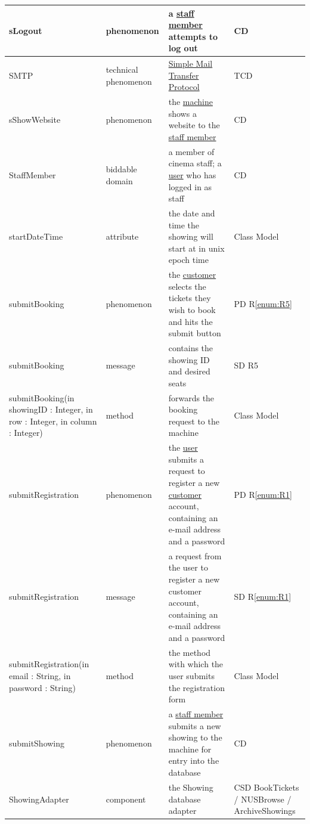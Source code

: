 \documentclass[a4paper,10pt,titlepage,bibtotoc,bibtotocnumbered]{scrreprt}
\begin{document}
\begin{longtable}{|p{.4\linewidth}|p{.2\linewidth}|p{.2\linewidth}|p{.2\linewidth}|}
\hline
\hypertarget{glossary:sLogout}{sLogout} & phenomenon & a \hyperlink{glossary:StaffMember}{staff member} attempts to log out & CD\\
\hline
SMTP & technical phenomenon & \href{http://tools.ietf.org/html/rfc2821}{Simple Mail Transfer Protocol} & TCD\\
\hline
\hypertarget{glossary:sShowWebsite}{sShowWebsite} & phenomenon & the \hyperlink{glossary:UDEKino}{machine} shows a website to the \hyperlink{glossary:StaffMember}{staff member} & CD\\
\hline
\hypertarget{glossary:StaffMember}{StaffMember} & biddable domain & a member of cinema staff; a \hyperlink{glossary:User}{user} who has logged in as staff & CD\\
\hline
startDateTime & attribute & the date and time the showing will start at in unix epoch time & Class Model\\
\hline
\hypertarget{glossary:submitBooking}{submitBooking} & phenomenon & the \hyperlink{glossary:Customer}{customer} selects the tickets they wish to book and hits the submit button &  PD R\ref{enum:R5}\\
\hline
submitBooking & message & contains the showing ID and desired seats & SD R5\\
\hline
submitBooking(in showingID : Integer, in row : Integer, in column : Integer) & method & forwards the booking request to the machine & Class Model\\
\hline
\hypertarget{glossary:submitRegistration}{submitRegistration} & phenomenon & the \hyperlink{glossary:User}{user} submits a request to register a new \hyperlink{glossary:Customer}{customer} account, containing an e-mail address and a password & PD R\ref{enum:R1}\\
\hline
submitRegistration & message & a request from the user to register a new customer account, containing an e-mail address and a password & SD R\ref{enum:R1}\\
\hline
submitRegistration(in email : String, in password : String) & method & the method with which the user submits the registration form & Class Model\\
\hline
\hypertarget{glossary:submitShowing}{submitShowing} & phenomenon & a \hyperlink{glossary:StaffMember}{staff member} submits a new showing to the machine for entry into the database & CD\\
\hline
ShowingAdapter & component & the Showing database adapter & CSD BookTickets / NUSBrowse / ArchiveShowings\\
\hline

\end{longtable}
\end{document}
